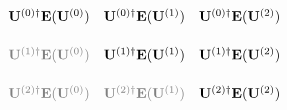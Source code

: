 \documentclass{standalone}
\begin{document}
    \(
        \begin{matrix}
            \mathbf{U}^{(0)\dagger} \mathbf{E}(\mathbf{U}^{(0)})
            &
            \mathbf{U}^{(0)\dagger} \mathbf{E}(\mathbf{U}^{(1)})
            &
            \mathbf{U}^{(0)\dagger} \mathbf{E}(\mathbf{U}^{(2)})
            \\[15pt]
            {{\color{gray}\mathbf{U}^{(1)\dagger} \mathbf{E}(\mathbf{U}^{(0)})}}
            &
            \mathbf{U}^{(1)\dagger} \mathbf{E}(\mathbf{U}^{(1)})
            &
            \mathbf{U}^{(1)\dagger} \mathbf{E}(\mathbf{U}^{(2)})
            \\[15pt]
            {{\color{gray}\mathbf{U}^{(2)\dagger} \mathbf{E}(\mathbf{U}^{(0)})}}
            &
            {{\color{gray}\mathbf{U}^{(2)\dagger} \mathbf{E}(\mathbf{U}^{(1)})}}
            &
            \mathbf{U}^{(2)\dagger} \mathbf{E}(\mathbf{U}^{(2)})
        \end{matrix}
    \)
\end{document}

